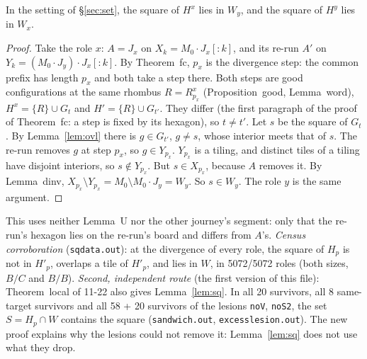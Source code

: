 \documentclass[11pt]{article}
\theoremstyle{definition}\newtheorem{definition}[theorem]{Definition}\newtheorem{remark}[theorem]{Remark}
\begin{document}
\begin{lemma}\label{lem:sq}
In the setting of \S\ref{sec:set}, the square of $H^x$ lies in $W_y$, and the square of $H^y$ lies in $W_x$.
\end{lemma}
\begin{proof}
Take the role $x$: $A=J_x$ on $X_k=M_0\cdot J_x[{:}k]$, and its re-run $A'$ on $Y_k=(M_0\cdot J_y)\cdot J_x[{:}k]$. By Theorem~fc, $p_x$ is the divergence step: the common prefix has length $p_x$ and both take a step there. Both steps are good configurations at the same rhombus $R=R^x_{p_x}$ (Proposition~good, Lemma~word), $H^x=\{R\}\cup G_t$ and $H'=\{R\}\cup G_{t'}$. They differ (the first paragraph of the proof of Theorem~fc: a step is fixed by its hexagon), so $t\neq t'$.
Let $s$ be the square of $G_t$. By Lemma~\ref{lem:ovl} there is $g\in G_{t'}$, $g\neq s$, whose interior meets that of $s$. The re-run removes $g$ at step $p_x$, so $g\in Y_{p_x}$. $Y_{p_x}$ is a tiling, and distinct tiles of a tiling have disjoint interiors, so $s\notin Y_{p_x}$. But $s\in X_{p_x}$, because $A$ removes it. By Lemma~dinv, $X_{p_x}\setminus Y_{p_x}=M_0\setminus M_0\cdot J_y=W_y$. So $s\in W_y$. The role $y$ is the same argument.
\end{proof}
\noindent This uses neither Lemma~U nor the other journey's segment: only that the re-run's hexagon lies on the re-run's board and differs from $A$'s. \emph{Census corroboration} (\texttt{sqdata.out}): at the divergence of every role, the square of $H_p$ is not in $H'_p$, overlaps a tile of $H'_p$, and lies in $W$, in 5072/5072 roles (both sizes, $B/C$ and $B/B$). \emph{Second, independent route} (the first version of this file): Theorem~local of 11-22 also gives Lemma~\ref{lem:sq}. In all 20 survivors, all 8 same-target survivors and all 58 + 20 survivors of the lesions \texttt{noV}, \texttt{noS2}, the set $S=H_p\cap W$ contains the square (\texttt{sandwich.out}, \texttt{excesslesion.out}). The new proof explains why the lesions could not remove it: Lemma~\ref{lem:sq} does not use what they drop.
\end{document}
